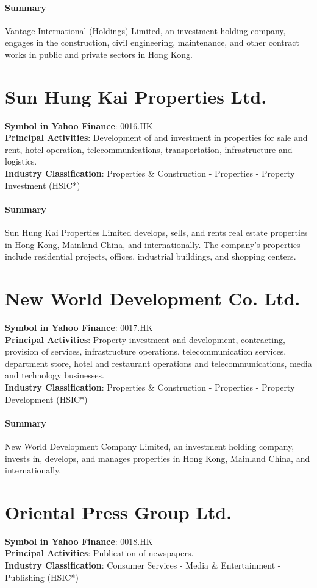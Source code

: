 \paragraph{Summary}
Vantage International (Holdings) Limited, an investment holding company, engages in the construction, civil engineering, maintenance, and other contract works in public and private sectors in Hong Kong.


\section{Sun Hung Kai Properties Ltd.}
\textbf{Symbol in Yahoo Finance}: 0016.HK\\
\textbf{Principal Activities}: Development of and investment in properties for sale and rent, hotel operation, telecommunications, transportation, infrastructure and logistics.\\
\textbf{Industry Classification}: Properties \& Construction - Properties - Property Investment (HSIC*)
\paragraph{Summary}
Sun Hung Kai Properties Limited develops, sells, and rents real estate properties in Hong Kong, Mainland China, and internationally. The company's properties include residential projects, offices, industrial buildings, and shopping centers.


\section{New World Development Co. Ltd.}
\textbf{Symbol in Yahoo Finance}: 0017.HK\\
\textbf{Principal Activities}: Property investment and development, contracting, provision of services, infrastructure operations, telecommunication services, department store, hotel and restaurant operations and telecommunications, media and technology businesses.\\
\textbf{Industry Classification}: Properties \& Construction - Properties - Property Development (HSIC*)
\paragraph{Summary}
New World Development Company Limited, an investment holding company, invests in, develops, and manages properties in Hong Kong, Mainland China, and internationally.


\section{Oriental Press Group Ltd.}
\textbf{Symbol in Yahoo Finance}: 0018.HK\\
\textbf{Principal Activities}: Publication of newspapers.\\
\textbf{Industry Classification}: Consumer Services - Media \& Entertainment - Publishing (HSIC*)
